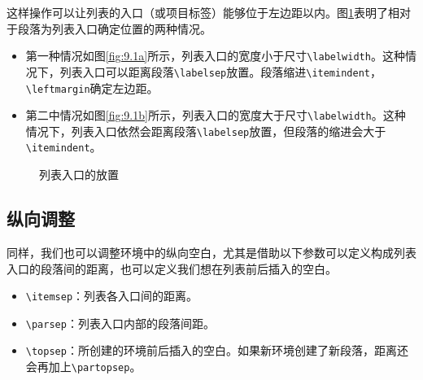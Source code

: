 这样操作可以让列表的入口（或项目标签）能够位于左边距以内。图\ref{fig:9.1}表明了相对于段落为列表入口确定位置的两种情况。

\begin{itemize}
    \item 第一种情况如图\ref{fig:9.1a}所示，列表入口的宽度小于尺寸\verb|\labelwidth|。这种情况下，列表入口可以距离段落\verb|\labelsep|放置。段落缩进\verb|\itemindent|，\verb|\leftmargin|确定左边距。
    \item 第二中情况如图\ref{fig:9.1b}所示，列表入口的宽度大于尺寸\verb|\labelwidth|。这种情况下，列表入口依然会距离段落\verb|\labelsep|放置，但段落的缩进会大于\verb|\itemindent|。
\end{itemize}

\begin{figure}[ht]
    \begin{center}
        \leavevmode {}
        \hspace{2cm}
      \caption{列表入口的放置}
      \label{fig:9.1}
    \end{center}
\end{figure}

\subsection{纵向调整}

同样，我们也可以调整环境中的纵向空白，尤其是借助以下参数可以定义构成列表入口的段落间的距离，也可以定义我们想在列表前后插入的空白。

\begin{itemize}
  \item \verb|\itemsep|：列表各入口间的距离。
  \item \verb|\parsep|：列表入口内部的段落间距。
  \item \verb|\topsep|：所创建的环境前后插入的空白。如果新环境创建了新段落，距离还会再加上\verb|\partopsep|。
\end{itemize}

